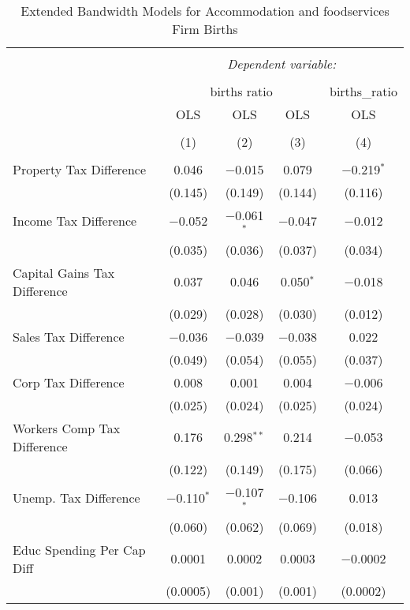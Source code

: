 
\begin{table}[!htbp] \centering 
  \caption{Extended Bandwidth Models for  Accommodation and foodservices Firm Births} 
  \label{72eb} 
\begin{tabular}{@{\extracolsep{5pt}}lcccc} 
\\[-1.8ex]\hline 
\hline \\[-1.8ex] 
 & \multicolumn{4}{c}{\textit{Dependent variable:}} \\ 
\cline{2-5} 
\\[-1.8ex] & \multicolumn{3}{c}{births ratio} & births\_ratio \\ 
 & OLS & OLS & OLS & OLS \\ 
\\[-1.8ex] & (1) & (2) & (3) & (4)\\ 
\hline \\[-1.8ex] 
 Property Tax Difference & 0.046 & $-$0.015 & 0.079 & $-$0.219$^{*}$ \\ 
  & (0.145) & (0.149) & (0.144) & (0.116) \\ 
  Income Tax Difference & $-$0.052 & $-$0.061$^{*}$ & $-$0.047 & $-$0.012 \\ 
  & (0.035) & (0.036) & (0.037) & (0.034) \\ 
  Capital Gains Tax Difference & 0.037 & 0.046 & 0.050$^{*}$ & $-$0.018 \\ 
  & (0.029) & (0.028) & (0.030) & (0.012) \\ 
  Sales Tax Difference & $-$0.036 & $-$0.039 & $-$0.038 & 0.022 \\ 
  & (0.049) & (0.054) & (0.055) & (0.037) \\ 
  Corp Tax Difference & 0.008 & 0.001 & 0.004 & $-$0.006 \\ 
  & (0.025) & (0.024) & (0.025) & (0.024) \\ 
  Workers Comp Tax Difference & 0.176 & 0.298$^{**}$ & 0.214 & $-$0.053 \\ 
  & (0.122) & (0.149) & (0.175) & (0.066) \\ 
  Unemp. Tax Difference & $-$0.110$^{*}$ & $-$0.107$^{*}$ & $-$0.106 & 0.013 \\ 
  & (0.060) & (0.062) & (0.069) & (0.018) \\ 
  Educ Spending Per Cap Diff & 0.0001 & 0.0002 & 0.0003 & $-$0.0002 \\ 
  & (0.0005) & (0.001) & (0.001) & (0.0002) \\ 

\end{tabular}
\end{table}
